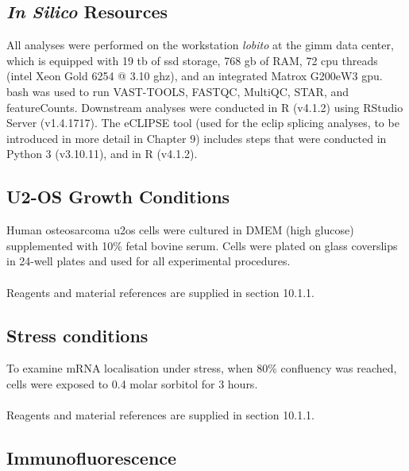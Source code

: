 \subsection{\textit{In Silico} Resources}

All analyses were performed on the workstation \textit{lobito} at the \gls{gimm} data center, which is equipped with 19 \gls{tb} of \gls{ssd} storage, 768 \gls{gb} of RAM, 72 \gls{cpu} threads (\gls{intel} Xeon
Gold 6254 @ 3.10 \gls{ghz}), and an integrated Matrox G200eW3 \gls{gpu}. \gls{bash} was used to run VAST-TOOLS\cite{tapial_atlas_2017}, FASTQC\cite{andrews_fastqc_2010}, MultiQC\cite{ewels_multiqc_2016}, STAR\cite{dobin_star_2013}, and featureCounts\cite{liao_featurecounts_2014}. Downstream analyses were conducted in R (v4.1.2) using RStudio Server (v1.4.1717). The eCLIPSE tool (used for the \gls{eclip} splicing analyses, to be introduced in more detail in Chapter 9) includes steps that were conducted in Python 3 (v3.10.11), and in R (v4.1.2). 


\subsection{U2-OS Growth Conditions}

Human osteosarcoma \gls{u2os} cells were cultured in DMEM (high glucose) supplemented with 10\% fetal bovine serum. Cells were plated on glass coverslips in 24-well plates and used for all experimental procedures.
\\
\\
Reagents and material references are supplied in section 10.1.1.

\subsection{Stress conditions}

To examine mRNA localisation under stress, when 80\% confluency was reached, cells were exposed to 0.4 \gls{molar} sorbitol for 3 hours.
\\
\\
Reagents and material references are supplied in section 10.1.1.

\subsection{Immunofluorescence}

